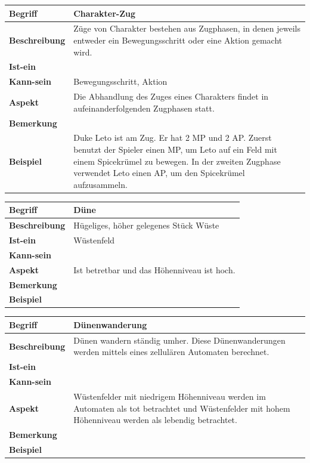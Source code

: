 \documentclass[12pt]{article}
\begin{document}
\begin{tabularx}{\linewidth}{|l|X|}
\hline
\textbf{Begriff} & \textbf{Charakter-Zug} \\
\hline
\textbf{Beschreibung} & Züge von Charakter bestehen aus Zugphasen, in denen jeweils entweder ein Bewegungsschritt oder eine Aktion gemacht wird.\\
\hline
\textbf{Ist-ein} & \\
\hline
\textbf{Kann-sein} & Bewegungsschritt, Aktion\\
\hline
\textbf{Aspekt} & Die Abhandlung des Zuges eines Charakters findet in aufeinanderfolgenden Zugphasen statt.\\
\hline
\textbf{Bemerkung} &  \\
\hline
\textbf{Beispiel} & Duke Leto ist am Zug. Er hat 2 MP und 2 AP. Zuerst benutzt der Spieler einen MP, um Leto auf ein Feld mit einem Spicekrümel zu bewegen. In der zweiten Zugphase verwendet Leto einen AP, um den Spicekrümel aufzusammeln.\\
\hline
\end{tabularx}

\begin{tabularx}{\linewidth}{|l|X|}
\hline
\textbf{Begriff} & \textbf{Düne} \\
\hline
\textbf{Beschreibung} & Hügeliges, höher gelegenes Stück Wüste \\
\hline
\textbf{Ist-ein} & Wüstenfeld \\
\hline
\textbf{Kann-sein} & \\
\hline
\textbf{Aspekt} & Ist betretbar und das Höhenniveau ist hoch. \\
\hline
\textbf{Bemerkung} &  \\
\hline
\textbf{Beispiel} &  \\
\hline
\end{tabularx}

\begin{tabularx}{\linewidth}{|l|X|}
\hline
\textbf{Begriff} & \textbf{Dünenwanderung} \\
\hline
\textbf{Beschreibung} & Dünen wandern ständig umher. Diese Dünenwanderungen werden mittels eines zellulären Automaten berechnet. \\
\hline
\textbf{Ist-ein} & \\
\hline
\textbf{Kann-sein} & \\
\hline
\textbf{Aspekt} & Wüstenfelder mit niedrigem Höhenniveau werden im Automaten als \glqq{}tot\grqq{} betrachtet und Wüstenfelder mit hohem Höhenniveau werden als \glqq{}lebendig\grqq{} betrachtet. \\
\hline
\textbf{Bemerkung} &  \\
\hline
\textbf{Beispiel} &  \\
\hline
\end{tabularx}
\end{document}

